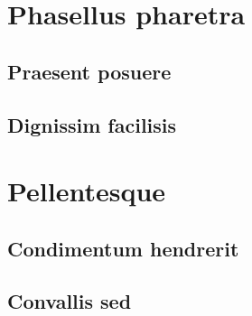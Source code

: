 			\lipsum[4-6]

	\section{Phasellus pharetra}
	
		\subsection{Praesent posuere}
		
			\lipsum[6-9]
			
		\subsection{Dignissim facilisis}
		
			\lipsum[10-12]
			
	\section{Pellentesque}
	
		\subsection{Condimentum hendrerit}
		
			\lipsum[13-14]
			
		\subsection{Convallis sed}
		
			\lipsum[15-17]
